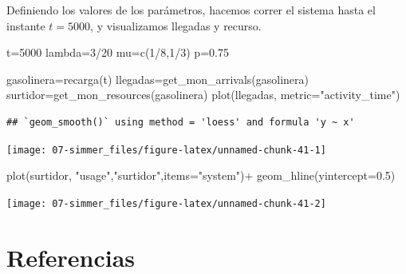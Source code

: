 \documentclass[
]{book}
\newenvironment{Shaded}{\begin{snugshade}}{\end{snugshade}}
\newcommand{\AttributeTok}[1]{\textcolor[rgb]{0.77,0.63,0.00}{#1}}
\newcommand{\DecValTok}[1]{\textcolor[rgb]{0.00,0.00,0.81}{#1}}
\newcommand{\FloatTok}[1]{\textcolor[rgb]{0.00,0.00,0.81}{#1}}
\newcommand{\FunctionTok}[1]{\textcolor[rgb]{0.00,0.00,0.00}{#1}}
\newcommand{\NormalTok}[1]{#1}
\newcommand{\OtherTok}[1]{\textcolor[rgb]{0.56,0.35,0.01}{#1}}
\newcommand{\SpecialCharTok}[1]{\textcolor[rgb]{0.00,0.00,0.00}{#1}}
\newcommand{\StringTok}[1]{\textcolor[rgb]{0.31,0.60,0.02}{#1}}
\theoremstyle{definition}
\theoremstyle{definition}
\theoremstyle{definition}
\theoremstyle{definition}
\theoremstyle{remark}
\begin{document}
Definiendo los valores de los parámetros, hacemos correr el sistema hasta el instante \(t=5000\), y visualizamos llegadas y recurso.

\begin{Shaded}
\begin{Highlighting}[]
\NormalTok{t}\OtherTok{=}\DecValTok{5000}
\NormalTok{lambda}\OtherTok{=}\DecValTok{3}\SpecialCharTok{/}\DecValTok{20}
\NormalTok{mu}\OtherTok{=}\FunctionTok{c}\NormalTok{(}\DecValTok{1}\SpecialCharTok{/}\DecValTok{8}\NormalTok{,}\DecValTok{1}\SpecialCharTok{/}\DecValTok{3}\NormalTok{)}
\NormalTok{p}\OtherTok{=}\FloatTok{0.75}
 
\NormalTok{gasolinera}\OtherTok{=}\FunctionTok{recarga}\NormalTok{(t) }
\NormalTok{llegadas}\OtherTok{=}\FunctionTok{get\_mon\_arrivals}\NormalTok{(gasolinera)}
\NormalTok{surtidor}\OtherTok{=}\FunctionTok{get\_mon\_resources}\NormalTok{(gasolinera)}
\FunctionTok{plot}\NormalTok{(llegadas, }\AttributeTok{metric=}\StringTok{"activity\_time"}\NormalTok{)}
\end{Highlighting}
\end{Shaded}

\begin{verbatim}
## `geom_smooth()` using method = 'loess' and formula 'y ~ x'
\end{verbatim}

\begin{center}\texttt{[image: 07-simmer\_files/figure-latex/unnamed-chunk-41-1]} \end{center}

\begin{Shaded}
\begin{Highlighting}[]
\FunctionTok{plot}\NormalTok{(surtidor, }\StringTok{"usage"}\NormalTok{,}\StringTok{"surtidor"}\NormalTok{,}\AttributeTok{items=}\StringTok{"system"}\NormalTok{)}\SpecialCharTok{+}
  \FunctionTok{geom\_hline}\NormalTok{(}\AttributeTok{yintercept=}\FloatTok{0.5}\NormalTok{)}
\end{Highlighting}
\end{Shaded}

\begin{center}\texttt{[image: 07-simmer\_files/figure-latex/unnamed-chunk-41-2]} \end{center}

\hypertarget{referencias}{%
\section{Referencias}\label{referencias}}
\end{document}

